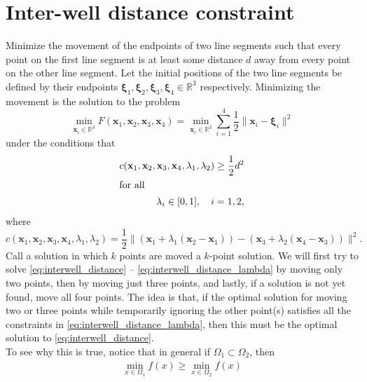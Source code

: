 \section{Inter-well distance constraint}
%
Minimize the movement of the endpoints of two line 
segments such that every point on the first 
line segment is at least some distance $d$ away 
from every point on the other line segment.
%
Let the initial positions of the two line segments be 
defined by their endpoints 
$\boldsymbol{\xi}_1, \boldsymbol{\xi}_2, \boldsymbol{\xi}_3, \boldsymbol{\xi}_4 \in \mathbb{R}^3$ 
respectively. Minimizing the movement is the solution to the problem
%
\begin{equation}
\min_{ \textbf{x}_i \in \mathbb{R}^3 } F(\textbf{x}_1,\textbf{x}_2,\textbf{x}_3,\textbf{x}_4) = \min_{ \textbf{x}_i \in \mathbb{R}^3 } \sum_{i=1}^4 \frac{1}{2} \| \textbf{x}_i - \boldsymbol{\xi}_i \|^2
\label{eq:interwell_distance}
\end{equation}
under the conditions that
\begin{align}
c(\textbf{x}_1,\textbf{x}_2,\textbf{x}_3,\textbf{x}_4,\lambda_1,\lambda_2) \geq \frac{1}{2} d^2\label{eq:interwell_distance_constraint}\\
\intertext{for all} 
\quad \lambda_i \in [0,1], \quad i=1,2,	\label{eq:interwell_distance_lambda}
\end{align}
%
where
%
\begin{equation}
c(\textbf{x}_1,\textbf{x}_2,\textbf{x}_3,\textbf{x}_4,\lambda_1,\lambda_2) = 
\frac{1}{2} \| (\textbf{x}_1 + \lambda_1 (\textbf{x}_2 - \textbf{x}_1 )) - (\textbf{x}_3 + \lambda_2 (\textbf{x}_4 - \textbf{x}_3)) \|^2.
\end{equation}
%
Call a solution in which $k$ points are moved a $k$-point solution. We will first
try to solve \eqref{eq:interwell_distance} -- \eqref{eq:interwell_distance_lambda} by
moving only two points, then by moving just three points, and lastly, if a solution is
not yet found, move all four points. The idea is that, if the optimal solution for
moving two or three points while temporarily ignoring the other point(s) satisfies all
the constraints in \eqref{eq:interwell_distance_lambda}, then this must be the 
optimal solution to \eqref{eq:interwell_distance}. \\
%
To see why this is true, notice that in general if $\Omega_1 \subset \Omega_2$,
then
\begin{align}
\min_{x \in \Omega_1} f(x) \geq \min_{x \in \Omega_2} f(x)
\label{eq:set_min}
\end{align}
